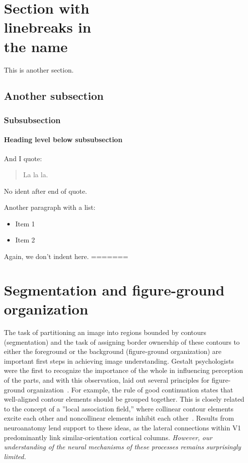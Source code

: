 \section[Optional table of contents heading]{Section with\\linebreaks in\\the
name}

This is another section.

\subsection{Another subsection}

\subsubsection{Subsubsection}

\paragraph{Heading level below subsubsection}
\label{sec:paragraph}

And I quote: 
%
\begin{quote}
La la la.
\end{quote}
%
\noindent No ident after end of quote.  

Another paragraph with a list:
%
\begin{itemize}
%  
\item Item 1
%
\item Item 2
%
\end{itemize}
%
\noindent Again, we don't indent here.
=======


\section{Segmentation and figure-ground organization}
The task of partitioning an image into regions bounded by contours (segmentation) and the task of assigning border ownership of these contours to either the foreground or the background (figure-ground organization) are important first steps in achieving image understanding. Gestalt psychologists were the first to recognize the importance of the whole in influencing perception of the parts, and with this observation, laid out several principles for figure-ground
organization~. For example, the rule of good continuation states that well-aligned contour elements should be grouped together. This is closely related to the concept of a ''local association field,'' where collinear contour elements excite each other and noncollinear elements inhibit each other~\citep{Ullman92, Field_etal93}. Results from neuroanatomy lend support to these ideas, as the lateral connections within V1 predominantly link similar-orientation cortical columns. \textit{However, our
  understanding of the neural mechanisms of these processes remains
  surprisingly limited.}
 
